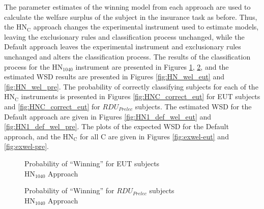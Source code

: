 \documentclass[../main.tex]{subfiles}
\begin{document}
The parameter estimates of the winning model from each approach are used to calculate the welfare surplus of the subject in the insurance task as before.
Thus, the $\text{HN}_\text{C}$ approach changes the experimental instrument used to estimate models, leaving the exclusionary rules and classification process unchanged, while the Default approach leaves the experimental instrument and exclusionary rules unchanged and alters the classification process.
The results of the classification process for the $\text{HN}_{1040}$ instrument are presented in Figures \ref{fig:HN_win_eut}, \ref{fig:HN_win_pre}, and the estimated WSD results are presented in Figures \ref{fig:HN_wel_eut} and \ref{fig:HN_wel_pre}.
The probability of correctly classifying subjects for each of the $\text{HN}_\text{C}$ instruments is presented in Figures \ref{fig:HNC_correct_eut} for EUT subjects and \ref{fig:HNC_correct_eut} for $\mathit{RDU_{Prelec}}$ subjects.
The estimated WSD for the Default approach are given in Figures \ref{fig:HN1_def_wel_eut} and \ref{fig:HN1_def_wel_pre}.
The plots of the expected WSD for the Default approach, and the $\text{HN}_\text{C}$ for all C are given in Figures \ref{fig:exwel-eut} and \ref{fig:exwel-pre}.

\begin{figure}[h!]
	\center
	\caption{Probability of \enquote{Winning} for EUT subjects\\$\text{HN}_{1040}$ Approach}
	\label{fig:HN_win_eut}
\end{figure}

\begin{figure}[h!]
	\center
	\caption{Probability of \enquote{Winning} for $\mathit{RDU_{Prelec}}$ subjects\\$\text{HN}_{1040}$ Approach}
	\label{fig:HN_win_pre}
\end{figure}
\end{document}
